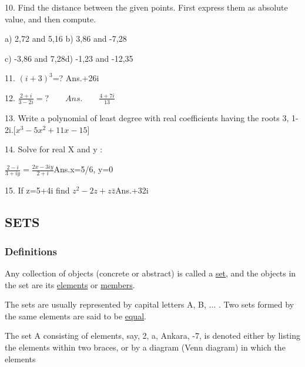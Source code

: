 \documentclass[11pts]{amsbook}
\begin{document}
10. Find the distance between the given points. First express them as absolute value, and then compute.
    
    a) 2,72 and 5,16 \qquad b) 3,86 and -7,28
    
	c) -3,86 and 7,28\qquad d) -1,23 and -12,35
    
    11. $(i+3)^3$=? \qquad Ans.+26i
    
    12. $\frac{2+i}{3-2i}=? \qquad Ans.\qquad \frac{4+7i}{13}$
    
    13. Write a polynomial of least degree with real coefficients having the roots 3, 1-2i.[$x^3-5x^2+11x-15$]
    
    14. Solve for real X and y :
    \begin{center}
	$\frac{2-i}{3+iy}=\frac{2x-3iy}{2+i}$\qquad Ans.\qquad x=5/6, y=0
	\end{center}
    15. If z=5+4i find $z^2-2z+z\bar{z}$\qquad Ans.+32i
	
    \subsection{SETS}
    \subsubsection{Definitions}
    \qquad Any collection of objects (concrete or abstract) is called a \underline{set}, and the objects in the set are its \underline{elements} or \underline{members}.
    
    \qquad The sets are usually represented by capital letters A, B, ... . Two sets formed by the same elements are said to be \underline{equal}.
    
    \qquad The set A consisting of elements, say, 2, a, Ankara, -7, is denoted either by listing the elements within two braces, or by a diagram (Venn diagram) in which the elements
\end{document}

